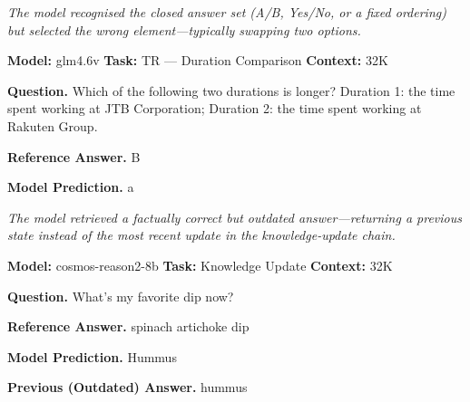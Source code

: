 \documentclass{llmxive}
\begin{document}
\begin{tcolorbox}[
  title={Case Study: Closed-Set Selection Error},
  enhanced, sharp corners,
  colback=gray!3, colframe=black!40,
  boxrule=0.4pt, fonttitle=\bfseries,
  left=4pt, right=4pt, top=3pt, bottom=3pt
]
\footnotesize

\textit{The model recognised the closed answer set (A/B, Yes/No, or a fixed ordering) but selected the wrong element---typically swapping two options.}
\vspace{0.4em}

\textbf{Model:} glm4.6v \hfill \textbf{Task:} TR --- Duration Comparison \hfill \textbf{Context:} 32K
\vspace{0.3em}

\textbf{Question.} Which of the following two durations is longer? Duration 1: the time spent working at JTB Corporation; Duration 2: the time spent working at Rakuten Group.
\vspace{0.3em}

\textbf{Reference Answer.} B

\textbf{Model Prediction.} a

\end{tcolorbox}

\begin{tcolorbox}[
  title={Case Study: Stale Retrieval},
  enhanced, sharp corners,
  colback=gray!3, colframe=black!40,
  boxrule=0.4pt, fonttitle=\bfseries,
  left=4pt, right=4pt, top=3pt, bottom=3pt
]
\footnotesize

\textit{The model retrieved a factually correct but \emph{outdated} answer---returning a previous state instead of the most recent update in the knowledge-update chain.}
\vspace{0.4em}

\textbf{Model:} cosmos-reason2-8b \hfill \textbf{Task:} Knowledge Update \hfill \textbf{Context:} 32K
\vspace{0.3em}

\textbf{Question.} What's my favorite dip now?
\vspace{0.3em}

\textbf{Reference Answer.} spinach artichoke dip

\textbf{Model Prediction.} Hummus

\textbf{Previous (Outdated) Answer.} hummus

\end{tcolorbox}
\end{document}
